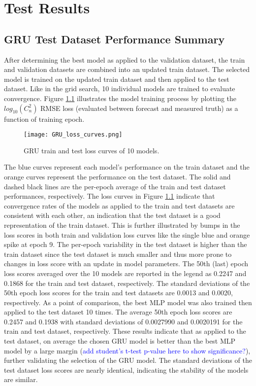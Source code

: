 \chapter{Test Results}
\label{ch5}

\section{GRU Test Dataset Performance Summary}
After determining the best model as applied to the validation dataset, the train and validation datasets are combined into an updated train dataset. The selected model is trained on the updated train dataset and then applied to the test dataset. Like in the grid search, 10 individual models are trained to evaluate convergence. Figure \ref{fig:GRU_train_test_loss_curves} illustrates the model training process by plotting the $log_{10}(C_{n}^{2})$ RMSE loss (evaluated between forecast and measured truth) as a function of training epoch.
\begin{figure}[h!]
	\centering
	\texttt{[image: GRU\_loss\_curves.png]}
	\caption{GRU train and test loss curves of 10 models.}
	\label{fig:GRU_train_test_loss_curves}
\end{figure}
The blue curves represent each model's performance on the train dataset and the orange curves represent the performance on the test dataset. The solid and dashed black lines are the per-epoch average of the train and test dataset performances, respectively. The loss curves in Figure \ref{fig:GRU_train_test_loss_curves} indicate that convergence rates of the models as applied to the train and test datasets are consistent with each other, an indication that the test dataset is a good representation of the train dataset. This is further illustrated by bumps in the loss scores in both train and validation loss curves like the single blue and orange spike at epoch 9. The per-epoch variability in the test dataset is higher than the train dataset since the test dataset is much smaller and thus more prone to changes in loss score with an update in model parameters. The 50th (last) epoch loss scores averaged over the 10 models are reported in the legend as 0.2247 and 0.1868 for the train and test dataset, respectively. The standard deviations of the 50th epoch loss scores for the train and test datasets are 0.0013 and 0.0020, respectively. As a point of comparison, the best MLP model was also trained then applied to the test dataset 10 times. The average 50th epoch loss scores are 0.2457 and 0.1938 with standard deviations of 0.0027990 and 0.0020191 for the train and test dataset, respectively. These results indicate that as applied to the test dataset, on average the chosen GRU model is better than the best MLP model by a large margin (\textcolor{blue}{add student's t-test p-value here to show significance?}), further validating the selection of the GRU model. The standard deviations of the test dataset loss scores are nearly identical, indicating the stability of the models are similar.


